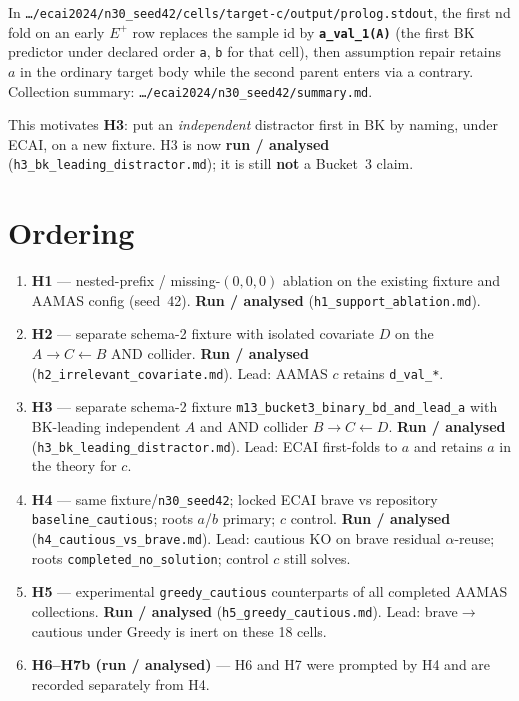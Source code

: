 \documentclass[11pt]{article}
\begin{document}
In \texttt{\ldots/ecai2024/n30\_seed42/cells/target-c/output/prolog.stdout},
the first nd fold on an early \(E^+\) row replaces the sample id by
\textbf{\texttt{a\_val\_1(A)}} (the first BK predictor under declared order
\texttt{a}, \texttt{b} for that cell), then assumption repair retains \(a\) in
the ordinary target body while the second parent enters via a contrary.
Collection summary: \texttt{\ldots/ecai2024/n30\_seed42/summary.md}.

This motivates \textbf{H3}: put an \emph{independent} distractor first in BK by
naming, under ECAI, on a new fixture. H3 is now \textbf{run / analysed}
(\texttt{h3\_bk\_leading\_distractor.md}); it is still \textbf{not} a Bucket~3
claim.

\section{Ordering}

\begin{enumerate}
  \item \textbf{H1} --- nested-prefix / missing-\((0,0,0)\) ablation on
    the existing fixture and AAMAS config (seed~42).
    \textbf{Run / analysed} (\texttt{h1\_support\_ablation.md}).
  \item \textbf{H2} --- separate schema-2 fixture with isolated
    covariate \(D\) on the \(A\to C\leftarrow B\) AND collider.
    \textbf{Run / analysed} (\texttt{h2\_irrelevant\_covariate.md}).
    Lead: AAMAS \(c\) retains \texttt{d\_val\_*}.
  \item \textbf{H3} --- separate schema-2 fixture
    \texttt{m13\_bucket3\_binary\_bd\_and\_lead\_a} with BK-leading independent
    \(A\) and AND collider \(B\to C\leftarrow D\).
    \textbf{Run / analysed} (\texttt{h3\_bk\_leading\_distractor.md}).
    Lead: ECAI first-folds to \(a\) and retains \(a\) in the theory for \(c\).
  \item \textbf{H4} --- same fixture/\texttt{n30\_seed42}; locked ECAI
    brave vs repository \texttt{baseline\_cautious}; roots \(a\)/\(b\)
    primary; \(c\) control.
    \textbf{Run / analysed} (\texttt{h4\_cautious\_vs\_brave.md}).
    Lead: cautious KO on brave residual $\alpha$-reuse; roots
    \texttt{completed\_no\_solution}; control \(c\) still solves.
  \item \textbf{H5} --- experimental \texttt{greedy\_cautious} counterparts of
    all completed AAMAS collections.
    \textbf{Run / analysed} (\texttt{h5\_greedy\_cautious.md}).
    Lead: brave$\to$cautious under Greedy is inert on these 18 cells.
  \item \textbf{H6--H7b (run / analysed)} --- H6 and H7
    were prompted by H4 and are recorded separately from H4.
\end{enumerate}
\end{document}
